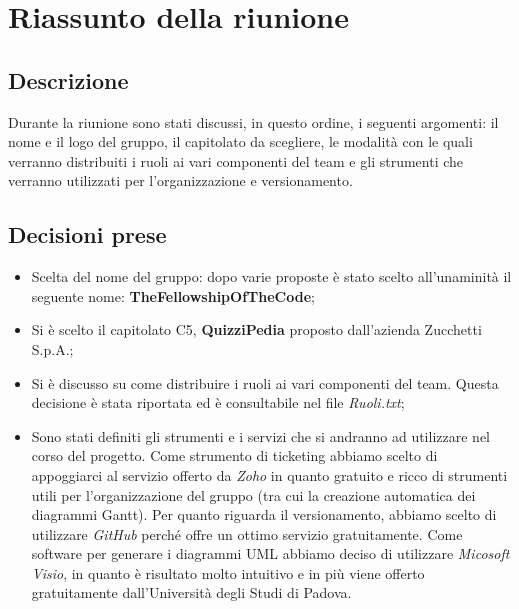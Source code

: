 \section{Riassunto della riunione}
\subsection{Descrizione}

Durante la riunione sono stati discussi, in questo ordine, i seguenti argomenti: il nome e il logo del gruppo, il capitolato da scegliere, le modalità con le quali verranno distribuiti i ruoli ai vari componenti del team e gli strumenti che verranno utilizzati per l'organizzazione e versionamento.

\subsection{Decisioni prese}
\begin{itemize}
\item Scelta del nome del gruppo: dopo varie proposte è stato scelto all'unaminità il seguente nome: \textbf{TheFellowshipOfTheCode};
\item Si è scelto il capitolato C5, \textbf{QuizziPedia} proposto dall'azienda Zucchetti S.p.A.;
\item Si è discusso su come distribuire i ruoli ai vari componenti del team. Questa decisione è stata riportata ed è consultabile nel file \textsl{Ruoli.txt};
\item Sono stati definiti gli strumenti e i servizi che si andranno ad utilizzare nel corso del progetto. Come strumento di ticketing abbiamo scelto di appoggiarci al servizio offerto da \textsl{Zoho} in quanto gratuito e ricco di strumenti utili per l'organizzazione del gruppo (tra cui la creazione automatica dei diagrammi Gantt). Per quanto riguarda il versionamento, abbiamo scelto di utilizzare \textsl{GitHub} perché offre un ottimo servizio gratuitamente. Come software per generare i diagrammi UML abbiamo deciso di utilizzare \textsl{Micosoft Visio}, in quanto è risultato molto intuitivo e in più viene offerto gratuitamente dall'Università degli Studi di Padova.
\end{itemize}